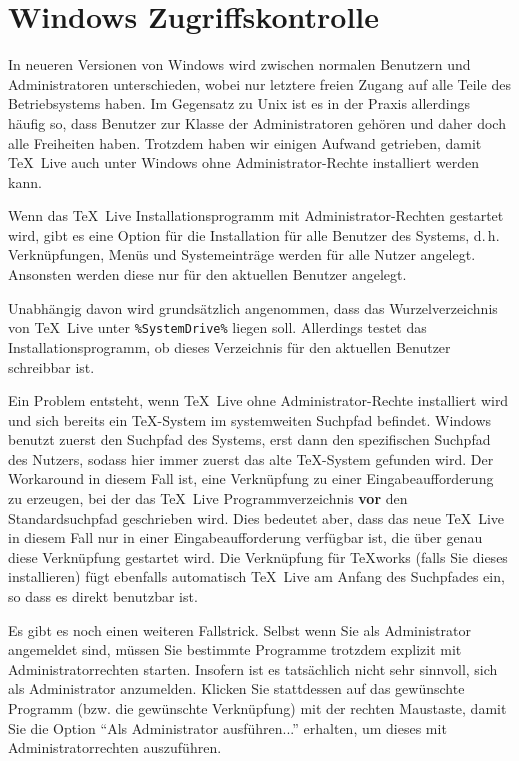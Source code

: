 \documentclass[12pt,ngerman,a4paper,fullparskip]{scrreprt}
\newcommand{\TL}{\TeX\ Live\xspace}
\begin{document}
\section{Windows Zugriffskontrolle}
\label{sec:winpermissions}

In neueren Versionen von Windows wird zwischen normalen Benutzern und Administratoren unterschieden, wobei nur letztere freien Zugang auf alle Teile des Betriebsystems haben. 
Im Gegensatz zu Unix ist es in der Praxis allerdings häufig so, dass Benutzer zur Klasse der Administratoren
gehören und daher doch alle Freiheiten haben. 
Trotzdem haben wir einigen Aufwand getrieben, damit \TL auch unter Windows ohne Administrator-Rechte
installiert werden kann.

Wenn das \TL Installationsprogramm mit Administrator-Rechten gestartet wird, gibt es eine Option für die Installation für alle Benutzer des Systems, d.\,h. Verknüpfungen, Menüs und Systemeinträge werden für alle Nutzer angelegt. 
Ansonsten werden diese nur für den aktuellen Benutzer angelegt.

Unabhängig davon wird grundsätzlich angenommen, dass das Wurzelverzeichnis
von \TL unter \verb|%SystemDrive%| liegen soll. Allerdings testet das
Installationsprogramm, ob dieses Verzeichnis für den aktuellen Benutzer
schreibbar ist.

Ein Problem entsteht, wenn \TL ohne Administrator-Rechte installiert
wird und sich bereits ein \TeX{}-System im systemweiten Suchpfad
befindet. Windows benutzt zuerst den Suchpfad des Systems, erst dann
den spezifischen Suchpfad des Nutzers, sodass hier immer zuerst
das alte \TeX-System gefunden wird. Der Workaround in diesem Fall ist, eine Verknüpfung zu einer Eingabeaufforderung zu erzeugen, bei der das \TL Programmverzeichnis \textbf{vor} den Standard\-such\-pfad
geschrieben wird. Dies bedeutet aber, dass das neue \TL in diesem Fall nur in einer
Eingabeaufforderung verfügbar ist, die über genau diese Verknüpfung gestartet
wird. Die Verknüpfung für \TeX{}works (falls Sie dieses installieren)
fügt ebenfalls automatisch \TL{} am Anfang des Suchpfades ein, so dass
es direkt benutzbar ist.

Es gibt es noch einen weiteren Fallstrick. 
Selbst wenn Sie als Administrator angemeldet sind, müssen Sie bestimmte Programme trotzdem explizit
mit Administratorrechten starten. 
Insofern ist es tatsächlich nicht sehr sinnvoll, sich als Administrator anzumelden. 
Klicken Sie stattdessen auf das gewünschte Programm (bzw. die gewünschte Verknüpfung) mit der
rechten Maustaste, damit Sie die Option \enquote{Als Administrator ausführen...} erhalten, um dieses mit Administratorrechten auszuführen.
\end{document}
